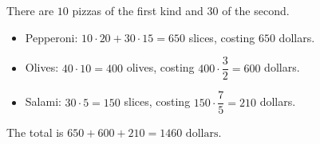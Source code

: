 There are $10$ pizzas of the first kind and $30$ of the second.
\begin{itemize}
\item Pepperoni: $10\cdot20+30\cdot15=650$ slices, costing $650$ dollars.
\item Olives: $40\cdot10=400$ olives, costing $400\cdot\dfrac{3}{2}=600$ dollars.
\item Salami: $30\cdot5=150$ slices, costing $150\cdot\dfrac{7}{5}=210$ dollars.
\end{itemize}
The total is $650+600+210=\boxed{1460\text{ dollars}}$.
